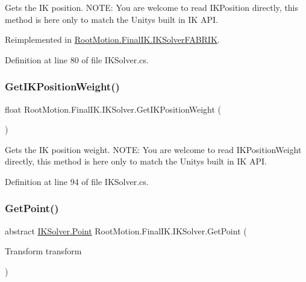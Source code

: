 Gets the IK position. N\+O\+TE\+: You are welcome to read I\+K\+Position directly, this method is here only to match the Unity\textquotesingle{}s built in IK A\+PI. 



Reimplemented in \mbox{\hyperlink{class_root_motion_1_1_final_i_k_1_1_i_k_solver_f_a_b_r_i_k_a7f4bae5e4ea308ac0b86a1694e60341a}{Root\+Motion.\+Final\+I\+K.\+I\+K\+Solver\+F\+A\+B\+R\+IK}}.



Definition at line 80 of file I\+K\+Solver.\+cs.

\mbox{\label{class_root_motion_1_1_final_i_k_1_1_i_k_solver_a1e7f3581aacd744aa9ec017d87f6ad29}} 
\subsubsection{\texorpdfstring{Get\+I\+K\+Position\+Weight()}{GetIKPositionWeight()}}
{\footnotesize\ttfamily float Root\+Motion.\+Final\+I\+K.\+I\+K\+Solver.\+Get\+I\+K\+Position\+Weight (\begin{DoxyParamCaption}{ }\end{DoxyParamCaption})}



Gets the IK position weight. N\+O\+TE\+: You are welcome to read I\+K\+Position\+Weight directly, this method is here only to match the Unity\textquotesingle{}s built in IK A\+PI. 



Definition at line 94 of file I\+K\+Solver.\+cs.

\mbox{\label{class_root_motion_1_1_final_i_k_1_1_i_k_solver_a8e845886025fb0ca404b85f6747f7281}} 
\subsubsection{\texorpdfstring{Get\+Point()}{GetPoint()}}
{\footnotesize\ttfamily abstract \mbox{\hyperlink{class_root_motion_1_1_final_i_k_1_1_i_k_solver_1_1_point}{I\+K\+Solver.\+Point}} Root\+Motion.\+Final\+I\+K.\+I\+K\+Solver.\+Get\+Point (\begin{DoxyParamCaption}\item[{Transform}]{transform }\end{DoxyParamCaption})\hspace{0.3cm}{\ttfamily [pure virtual]}}



